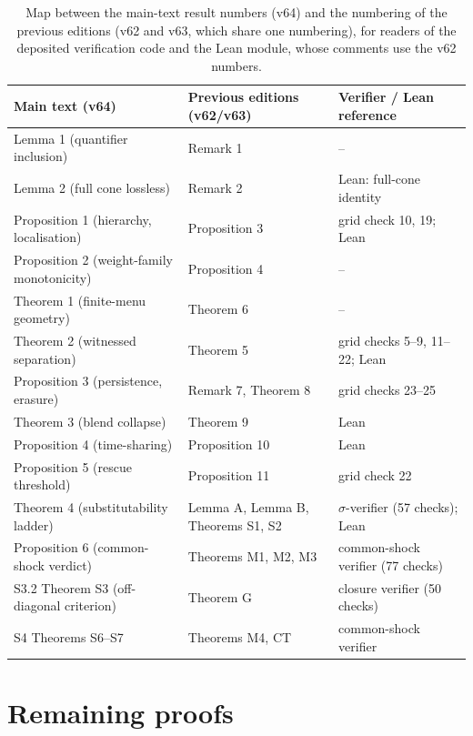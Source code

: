 \documentclass[preprint,11pt,authoryear]{elsarticle}
\theoremstyle{remark}
\begin{document}
\begin{table}[!htbp]
\centering\small
\caption{Map between the main-text result numbers (v64) and the numbering of the previous editions (v62 and v63, which share one numbering), for readers of the deposited verification code and the Lean module, whose comments use the v62 numbers.}
\begin{tabularx}{\textwidth}{@{}>{\raggedright\arraybackslash}p{}>{\raggedright\arraybackslash}p{}X@{}}
\toprule
Main text (v64) & Previous editions (v62/v63) & Verifier / Lean reference \\
\midrule
Lemma 1 (quantifier inclusion) & Remark 1 & -- \\
Lemma 2 (full cone lossless) & Remark 2 & Lean: full-cone identity \\
Proposition 1 (hierarchy, localisation) & Proposition 3 & grid check 10, 19; Lean \\
Proposition 2 (weight-family monotonicity) & Proposition 4 & -- \\
Theorem 1 (finite-menu geometry) & Theorem 6 & -- \\
Theorem 2 (witnessed separation) & Theorem 5 & grid checks 5--9, 11--22; Lean \\
Proposition 3 (persistence, erasure) & Remark 7, Theorem 8 & grid checks 23--25 \\
Theorem 3 (blend collapse) & Theorem 9 & Lean \\
Proposition 4 (time-sharing) & Proposition 10 & Lean \\
Proposition 5 (rescue threshold) & Proposition 11 & grid check 22 \\
Theorem 4 (substitutability ladder) & Lemma A, Lemma B, Theorems S1, S2 & $\sigma$-verifier (57 checks); Lean \\
Proposition 6 (common-shock verdict) & Theorems M1, M2, M3 & common-shock verifier (77 checks) \\
S3.2 Theorem S3 (off-diagonal criterion) & Theorem G & closure verifier (50 checks) \\
S4 Theorems S6--S7 & Theorems M4, CT & common-shock verifier \\
\bottomrule
\end{tabularx}
\end{table}

\section{Remaining proofs}\label{si:proofs}
\end{document}
